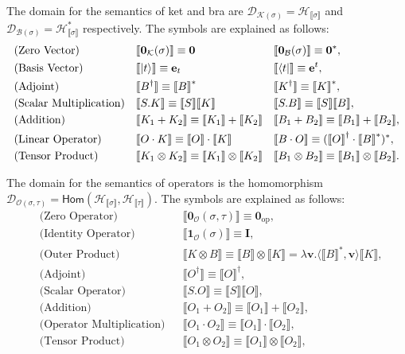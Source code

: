 \documentclass[manuscript, review, timestamp]{acmart}
\newcommand*{\sem}[1]{{\llbracket #1 \rrbracket}}
\begin{document}
\begin{definition}
  The domain for the semantics of ket and bra are $\mathcal{D}_{\mathcal{K}(\sigma)} = \mathcal{H}_{\sem{\sigma}}$ and $\mathcal{D}_{\mathcal{B}(\sigma)} = \mathcal{H}_{\sem{\sigma}}^*$ respectively.
  The symbols are explained as follows:
  \begin{align*}
    & \text{(Zero Vector)} &&
    \sem{\mathbf{0}_\mathcal{K}(\sigma)} \equiv \mathbf{0} && \sem{\mathbf{0}_\mathcal{B}(\sigma)} \equiv \mathbf{0}^*, \\
    & \text{(Basis Vector)} &&
    \sem{\ket{t}} \equiv \mathbf{e}_t && \sem{\bra{t}} \equiv \mathbf{e}^t, \\
    & \text{(Adjoint)} &&
    \sem{B^\dagger} \equiv \sem{B}^* && \sem{K^\dagger} \equiv \sem{K}^*, \\
    & \text{(Scalar Multiplication)} &&
    \sem{S.K} \equiv \sem{S} \sem{K} && \sem{S.B} \equiv \sem{S} \sem{B}, \\
    & \text{(Addition)} &&
    \sem{K_1 + K_2} \equiv \sem{K_1} + \sem{K_2} && \sem{B_1 + B_2} \equiv \sem{B_1} + \sem{B_2}, \\
    & \text{(Linear Operator)} &&
    \sem{O \cdot K} \equiv \sem{O} \cdot \sem{K} && \sem{B \cdot O} \equiv (\sem{O}^\dagger \cdot \sem{B}^*)^*, \\
    & \text{(Tensor Product)} &&
    \sem{K_1 \otimes K_2} \equiv \sem{K_1} \otimes \sem{K_2} && \sem{B_1 \otimes B_2} \equiv \sem{B_1} \otimes \sem{B_2}.
  \end{align*}
\end{definition}



\begin{definition}
  The domain for the semantics of operators is the homomorphism $\mathcal{D}_{\mathcal{O}(\sigma, \tau)} = \textsf{Hom}(\mathcal{H}_\sem{\sigma}, \mathcal{H}_\sem{\tau})$.
  The symbols are explained as follows:
  \begin{align*}
    & \text{(Zero Operator)} &&
    \sem{\mathbf{0}_\mathcal{O}(\sigma, \tau)} \equiv \mathbf{0}_{\textrm{op}}, \\
    & \text{(Identity Operator)} &&
    \sem{\mathbf{1}_\mathcal{O}(\sigma)} \equiv \mathbf{I}, \\
    & \text{(Outer Product)} &&
    \sem{K \otimes B} \equiv \sem{B} \otimes \sem{K} = \lambda \mathbf{v}. \langle \sem{B}^*, \mathbf{v}\rangle \sem{K}, \\
    & \text{(Adjoint)} &&
    \sem{O^\dagger} \equiv \sem{O}^\dagger, \\
    & \text{(Scalar Operator)} &&
    \sem{S.O} \equiv \sem{S} \sem{O}, \\
    & \text{(Addition)} &&
    \sem{O_1 + O_2} \equiv \sem{O_1}+\sem{O_2}, \\
    & \text{(Operator Multiplication)} &&
    \sem{O_1 \cdot O_2} \equiv \sem{O_1} \cdot \sem{O_2}, \\
    & \text{(Tensor Product)} &&
    \sem{O_1 \otimes O_2} \equiv \sem{O_1} \otimes \sem{O_2},
  \end{align*}
\end{definition}
\end{document}
